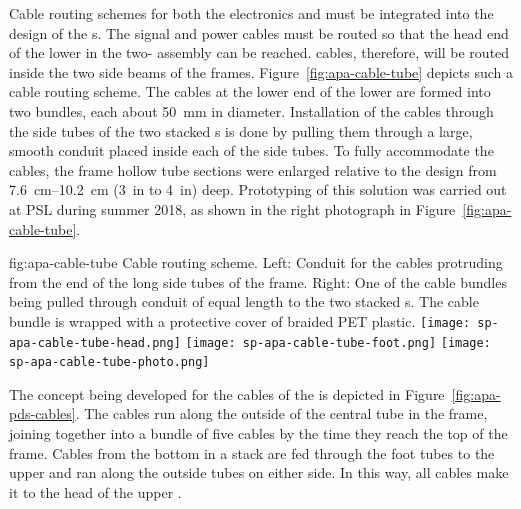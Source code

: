 Cable routing schemes for both the  electronics and  must be integrated into the design of the s.   The  signal and power cables must be routed so that the head end of the lower  in the two- assembly can be reached.  cables, therefore, will be routed inside the two side beams of the  frames. Figure~\ref{fig:apa-cable-tube} depicts such a cable routing scheme.  The  cables at the lower end of the lower  are formed into two bundles, each about \SI{50}{mm} in diameter. Installation of the cables through the side tubes of the two stacked s is done by pulling them through a large, smooth conduit placed inside each of the side tubes.  To fully accommodate the cables, the  frame hollow tube sections were enlarged relative to the  design from \SIrange{7.6}{10.2}{cm} (\SI{3}{in} to \SI{4}{in}) deep. Prototyping of this solution was carried out at PSL during summer 2018, as shown in the right photograph in Figure~\ref{fig:apa-cable-tube}.     



\begin{dunefigure}{fig:apa-cable-tube}
{Cable routing scheme. Left: Conduit for the  cables protruding from the end of the long side tubes of the  frame.  Right: One of the  cable bundles being pulled through conduit of equal length to the two stacked s.  The cable bundle is wrapped with a protective cover of braided PET plastic.  }
\texttt{[image: sp-apa-cable-tube-head.png]} \quad
\texttt{[image: sp-apa-cable-tube-foot.png]} \quad
\texttt{[image: sp-apa-cable-tube-photo.png]}
\end{dunefigure}

The concept being developed for the cables of the   is depicted in Figure~\ref{fig:apa-pds-cables}.  The cables run along the outside of the central tube in the  frame, joining together into a bundle of five cables by the time they reach the top of the frame.  Cables from the bottom  in a stack are fed through the foot tubes to the upper  and ran along the outside tubes on either side.  In this way, all  cables make it to the head of the upper .  

